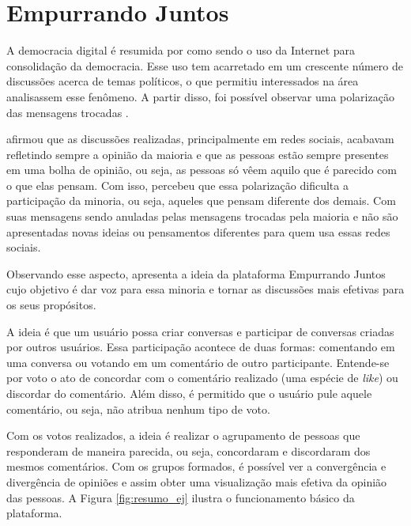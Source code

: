 \chapter{Empurrando Juntos} \label{cap:clusterizacao}


A democracia digital é resumida por  como sendo o uso da Internet para consolidação da democracia.
Esse uso tem acarretado em um crescente número de discussões acerca de temas políticos, o que permitiu interessados na área analisassem 
esse fenômeno. A partir disso, foi possível observar uma polarização das mensagens trocadas \cite{empurrandojuntos}.

 afirmou que as discussões realizadas, principalmente em redes sociais, 
acabavam refletindo sempre a opinião da maioria e que 
as pessoas estão sempre presentes em uma bolha de opinião, ou seja, as pessoas só vêem aquilo que é parecido com o que elas pensam.
Com isso, percebeu que essa polarização dificulta a participação da minoria, ou seja, aqueles que pensam diferente dos demais. 
Com suas mensagens sendo anuladas pelas mensagens trocadas pela maioria e não são apresentadas novas ideias ou pensamentos diferentes 
para quem usa essas redes sociais.

Observando esse aspecto,  apresenta a ideia da plataforma Empurrando Juntos cujo objetivo 
é dar voz para essa minoria e tornar as discussões mais efetivas para os seus propósitos.

A ideia é que um usuário possa criar conversas e participar de conversas criadas por outros usuários. Essa participação 
acontece de duas formas: comentando em uma conversa ou votando em um comentário de outro participante. Entende-se por voto
o ato de concordar com o comentário realizado (uma espécie de \textit{like}) ou discordar do comentário. Além disso, é permitido
que o usuário pule aquele comentário, ou seja, não atribua nenhum tipo de voto. 

Com os votos realizados, a ideia é realizar o agrupamento de pessoas que responderam de maneira parecida, ou seja, concordaram e
discordaram dos mesmos comentários. Com os grupos formados, é possível ver a convergência e divergência de opiniões e assim obter uma 
visualização mais efetiva da opinião das pessoas. A Figura \ref{fig:resumo_ej} ilustra o funcionamento básico da plataforma.

